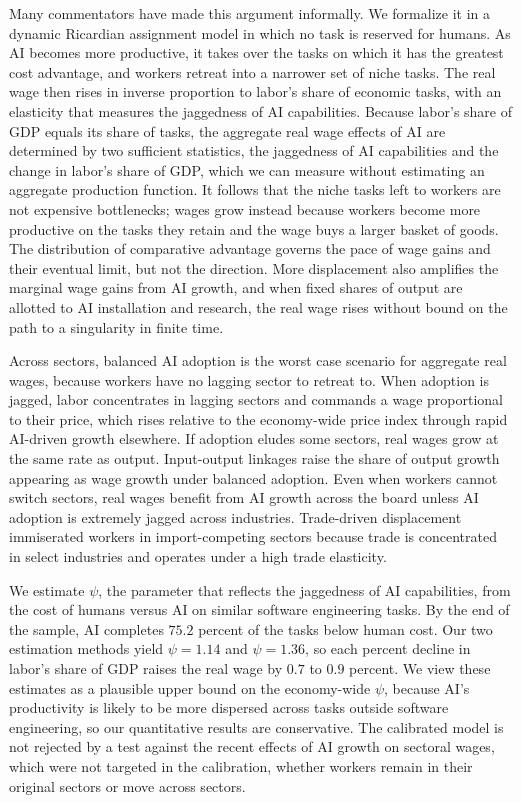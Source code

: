 \documentclass[11pt]{article}
\begin{document}
Many commentators have made this argument informally. We formalize
it in a dynamic Ricardian assignment model in which no task is reserved
for humans. As AI becomes more productive, it takes over the tasks
on which it has the greatest cost advantage, and workers retreat into
a narrower set of niche tasks. The real wage then rises in inverse
proportion to labor's share of economic tasks, with an elasticity
that measures the jaggedness of AI capabilities. Because labor's share
of GDP equals its share of tasks, the aggregate real wage effects
of AI are determined by two sufficient statistics, the jaggedness
of AI capabilities and the change in labor's share of GDP, which we
can measure without estimating an aggregate production function. It
follows that the niche tasks left to workers are not expensive bottlenecks;
wages grow instead because workers become more productive on the tasks
they retain and the wage buys a larger basket of goods. The distribution
of comparative advantage governs the pace of wage gains and their
eventual limit, but not the direction. More displacement also amplifies
the marginal wage gains from AI growth, and when fixed shares of output
are allotted to AI installation and research, the real wage rises
without bound on the path to a singularity in finite time.

Across sectors, balanced AI adoption is the worst case scenario for
aggregate real wages, because workers have no lagging sector to retreat
to. When adoption is jagged, labor concentrates in lagging sectors
and commands a wage proportional to their price, which rises relative
to the economy-wide price index through rapid AI-driven growth elsewhere.
If adoption eludes some sectors, real wages grow at the same rate
as output. Input-output linkages raise the share of output growth
appearing as wage growth under balanced adoption. Even when workers
cannot switch sectors, real wages benefit from AI growth across the
board unless AI adoption is extremely jagged across industries. Trade-driven
displacement immiserated workers in import-competing sectors because
trade is concentrated in select industries and operates under a high
trade elasticity.

We estimate $\psi$, the parameter that reflects the jaggedness of
AI capabilities, from the cost of humans versus AI on similar software
engineering tasks. By the end of the sample, AI completes $75.2$
percent of the tasks below human cost. Our two estimation methods
yield $\psi=1.14$ and $\psi=1.36$, so
each percent decline in labor's share of GDP raises the real wage
by $0.7$ to $0.9$ percent. We view
these estimates as a plausible upper bound on the economy-wide $\psi$,
because AI's productivity is likely to be more dispersed across tasks
outside software engineering, so our quantitative results are conservative.
The calibrated model is not rejected by a test against the recent
effects of AI growth on sectoral wages, which were not targeted in
the calibration, whether workers remain in their original sectors
or move across sectors.
\end{document}
